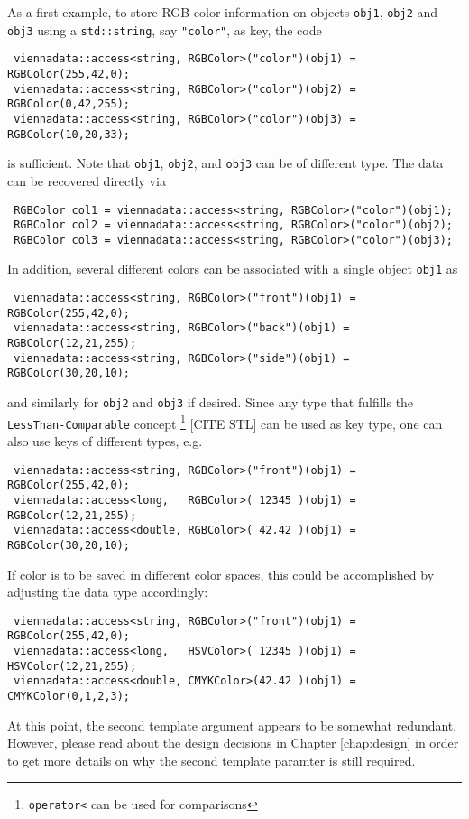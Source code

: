 As a first example, to store RGB color information on objects \lstinline|obj1|, \lstinline|obj2| and \lstinline|obj3| using a \lstinline|std::string|, say \lstinline|"color"|, as key,
the code
\begin{lstlisting}
 viennadata::access<string, RGBColor>("color")(obj1) = RGBColor(255,42,0);
 viennadata::access<string, RGBColor>("color")(obj2) = RGBColor(0,42,255);
 viennadata::access<string, RGBColor>("color")(obj3) = RGBColor(10,20,33);
\end{lstlisting}
is sufficient. Note that \lstinline|obj1|, \lstinline|obj2|, and \lstinline|obj3| can be of different type.
The data can be recovered directly via
\begin{lstlisting}
 RGBColor col1 = viennadata::access<string, RGBColor>("color")(obj1);
 RGBColor col2 = viennadata::access<string, RGBColor>("color")(obj2);
 RGBColor col3 = viennadata::access<string, RGBColor>("color")(obj3);
\end{lstlisting}
In addition, several different colors can be associated with a single object \lstinline|obj1|
as
\begin{lstlisting}
 viennadata::access<string, RGBColor>("front")(obj1) = RGBColor(255,42,0);
 viennadata::access<string, RGBColor>("back")(obj1) = RGBColor(12,21,255);
 viennadata::access<string, RGBColor>("side")(obj1) = RGBColor(30,20,10);
\end{lstlisting}
and similarly for \lstinline|obj2| and \lstinline|obj3| if desired.
 Since any type that fulfills the \lstinline|LessThan-Comparable| concept
\footnote{\lstinline|operator<| can be used for comparisons} [CITE STL] can be used as key type, one can also use keys of different types, e.g.
\begin{lstlisting}
 viennadata::access<string, RGBColor>("front")(obj1) = RGBColor(255,42,0);
 viennadata::access<long,   RGBColor>( 12345 )(obj1) = RGBColor(12,21,255);
 viennadata::access<double, RGBColor>( 42.42 )(obj1) = RGBColor(30,20,10);
\end{lstlisting}
If color is to be saved in different color spaces, this could be accomplished by adjusting the data type accordingly:
\begin{lstlisting}
 viennadata::access<string, RGBColor>("front")(obj1) = RGBColor(255,42,0);
 viennadata::access<long,   HSVColor>( 12345 )(obj1) = HSVColor(12,21,255);
 viennadata::access<double, CMYKColor>(42.42 )(obj1) = CMYKColor(0,1,2,3);
\end{lstlisting}
At this point, the second template argument appears to be somewhat redundant.
However, please read about the design decisions in Chapter \ref{chap:design} in order to get more details on why the second template paramter is still required.


